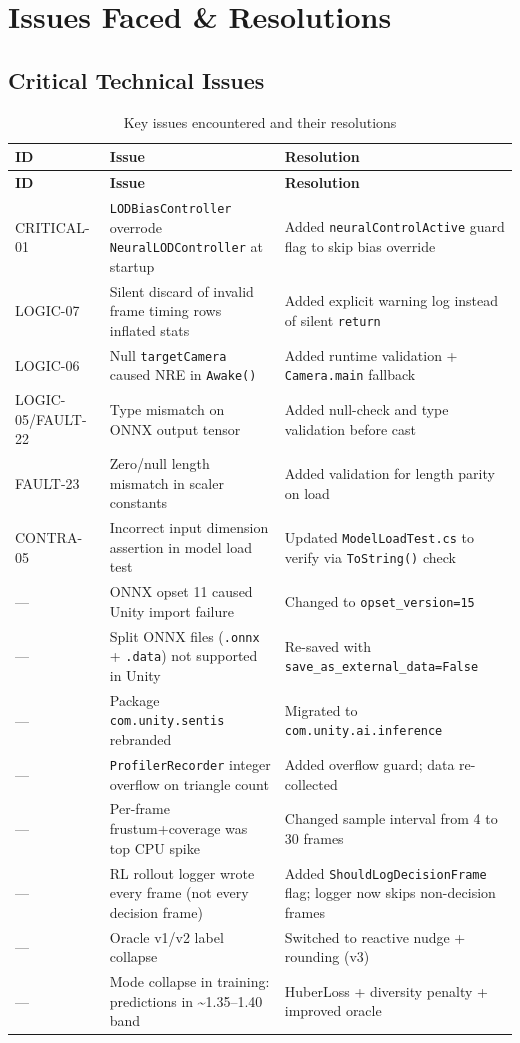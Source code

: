 \documentclass[12pt, a4paper]{article}
\begin{document}
\section{Issues Faced \& Resolutions}
\label{sec:issues}

\subsection{Critical Technical Issues}

\begin{longtable}{l p{5.5cm} p{5.5cm}}
\caption{Key issues encountered and their resolutions}\label{tab:issues}\\
\toprule
\textbf{ID} & \textbf{Issue} & \textbf{Resolution}\\
\midrule
\endfirsthead
\toprule
\textbf{ID} & \textbf{Issue} & \textbf{Resolution}\\
\midrule
\endhead
\bottomrule
\endfoot
CRITICAL-01 & \texttt{LODBiasController} overrode \texttt{NeuralLODController} at startup &
  Added \texttt{neuralControlActive} guard flag to skip bias override\\
LOGIC-07 & Silent discard of invalid frame timing rows inflated stats &
  Added explicit warning log instead of silent \texttt{return}\\
LOGIC-06 & Null \texttt{targetCamera} caused NRE in \texttt{Awake()} &
  Added runtime validation + \texttt{Camera.main} fallback\\
LOGIC-05/FAULT-22 & Type mismatch on ONNX output tensor &
  Added null-check and type validation before cast\\
FAULT-23 & Zero/null length mismatch in scaler constants &
  Added validation for length parity on load\\
CONTRA-05 & Incorrect input dimension assertion in model load test &
  Updated \texttt{ModelLoadTest.cs} to verify via \texttt{ToString()} check\\
— & ONNX opset 11 caused Unity import failure &
  Changed to \texttt{opset\_version=15}\\
— & Split ONNX files (\texttt{.onnx} + \texttt{.data}) not supported in Unity &
  Re-saved with \texttt{save\_as\_external\_data=False}\\
— & Package \texttt{com.unity.sentis} rebranded &
  Migrated to \texttt{com.unity.ai.inference}\\
— & \texttt{ProfilerRecorder} integer overflow on triangle count &
  Added overflow guard; data re-collected\\
— & Per-frame frustum+coverage was top CPU spike &
  Changed sample interval from 4 to 30 frames\\
— & RL rollout logger wrote every frame (not every decision frame) &
  Added \texttt{ShouldLogDecisionFrame} flag; logger now skips non-decision frames\\
— & Oracle v1/v2 label collapse & Switched to reactive nudge + rounding (v3)\\
— & Mode collapse in training: predictions in \textasciitilde1.35–1.40 band &
  HuberLoss + diversity penalty + improved oracle\\
\end{longtable}
\end{document}
